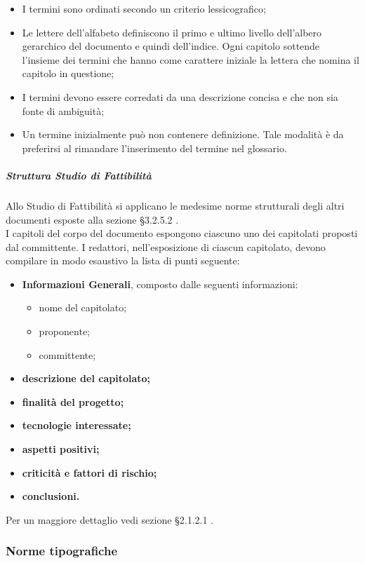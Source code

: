 					\begin{itemize}
						\item I  termini sono ordinati secondo un criterio lessicografico; 
						\item Le lettere dell'alfabeto definiscono il primo e ultimo livello dell’albero gerarchico del documento e quindi dell’indice. Ogni capitolo sottende l’insieme dei termini che hanno come carattere iniziale la lettera che nomina il capitolo in questione; 
						\item I termini devono essere corredati da una descrizione concisa e che non sia fonte di ambiguità; 
						\item Un termine inizialmente può non contenere definizione. Tale modalità è da preferirsi al rimandare l’inserimento del termine nel glossario.
					\end{itemize}
				\subparagraph{Struttura Studio di Fattibilità}
					Allo Studio di Fattibilità si applicano le medesime norme strutturali degli altri documenti esposte alla sezione §3.2.5.2 . \\
					I capitoli del corpo del documento espongono ciascuno uno dei capitolati proposti dal committente. I redattori, nell’esposizione di ciascun capitolato, devono compilare in modo esaustivo la lista di punti seguente: 
					\begin{itemize}
						\item\textbf{Informazioni Generali}, composto dalle seguenti informazioni:
							\begin{itemize}
								\item nome del capitolato;
								\item proponente;
								\item committente;
							\end{itemize}
						\item\textbf{descrizione del capitolato;}
						\item\textbf{finalità del progetto;}
						\item\textbf{tecnologie interessate;}
						\item\textbf{aspetti positivi;}
						\item\textbf{criticità e fattori di rischio;}
						\item\textbf{conclusioni.}
					\end{itemize}
					Per un maggiore dettaglio vedi sezione §2.1.2.1 .
		\subsubsection{Norme tipografiche}

